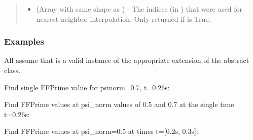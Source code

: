 \documentclass[letterpaper,10pt,english]{sphinxmanual}
\begin{document}
\begin{fulllineitems}
\begin{fulllineitems}
\begin{quote}
\begin{description}
\begin{itemize}
\item {} 
 (Array with same shape as ) - The indices
(in ) that were used for
nearest-neighbor interpolation. Only returned if  is
True.

\end{itemize}


\end{description}\end{quote}
\subsubsection*{Examples}

All assume that  is a valid instance of the appropriate
extension of the {\hyperref[\detokenize{eqtools:eqtools.core.Equilibrium}]{}} abstract class.

Find single FFPrime value for psinorm=0.7, t=0.26s:

\begin{sphinxVerbatim}[commandchars=\\\{\}]
   
\end{sphinxVerbatim}

Find FFPrime values at psi\_norm values of 0.5 and 0.7 at the single time
t=0.26s:

\begin{sphinxVerbatim}[commandchars=\\\{\}]
  \PYG{p}{[} \PYG{p}{]} 
\end{sphinxVerbatim}

Find FFPrime values at psi\_norm=0.5 at times t={[}0.2s, 0.3s{]}:

\begin{sphinxVerbatim}[commandchars=\\\{\}]
   \PYG{p}{[} \PYG{p}{]}
\end{sphinxVerbatim}


\end{fulllineitems}
\end{fulllineitems}
\end{document}
